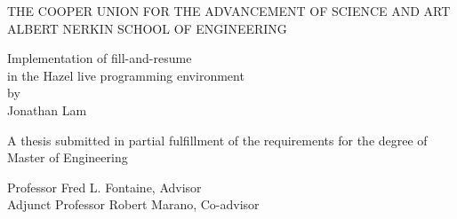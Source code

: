 \thispagestyle{empty}

{
  \centering
  \large
  
  \MakeUppercase{
    The Cooper Union for the Advancement of Science and Art \\
    Albert Nerkin School of Engineering
  }

  \vfill{}
  
  {
    {
      \Huge
      Implementation of fill-and-resume \\
      in the Hazel live programming environment \\
    }
    \vspace{20pt}
    {
      \Large
      by \\
      Jonathan Lam \\
    }
  }

  \vfill{}

  {
    A thesis submitted in partial fulfillment of the requirements for the degree of \\
    Master of Engineering \\
  }

  \vfill{}

  {
    Professor Fred L. Fontaine, Advisor \\
    \vspace{20pt}
    Adjunct Professor Robert Marano, Co-advisor \\

  }
}

